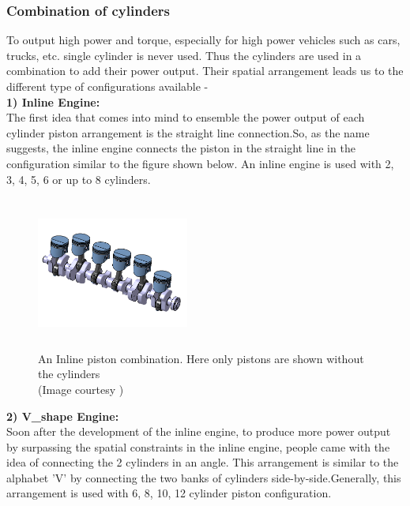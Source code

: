 \documentclass[11pt]{article}
\begin{document}
\begin{flushleft}
\subsubsection{Combination of cylinders}
To output high power and torque, especially for high power vehicles such as cars, trucks, etc. single cylinder is never used. Thus the cylinders are used in a combination to add their power output. Their spatial arrangement leads us to the different type of configurations available - \\
\textbf{1) Inline Engine:\\}
The first idea that comes into mind to ensemble the power output of each cylinder piston arrangement is the straight line connection.So, as the name suggests, the inline engine connects the piston in the straight line in the configuration similar to the figure shown below. An inline engine is used with 2, 3, 4, 5, 6 or up to 8 cylinders.\\
\end{flushleft}
\begin{center}
        \begin{figure}[!h]
        \centering
          \includegraphics[width=50mm, height=50mm]{Inline.jpg}
          \caption{An Inline piston combination. Here only pistons are shown without the cylinders\\ (Image courtesy \cite{ref11})
          }
          \label{fig:Piston}
        \end{figure}
\end{center}
\begin{flushleft}
\textbf{2) V\_shape Engine: \\}
Soon after the development of the inline engine, to produce more power output by surpassing the spatial constraints in the inline engine, people came with the idea of connecting the 2 cylinders in an angle. This arrangement is similar to the alphabet 'V' by connecting the two banks of cylinders side-by-side.Generally, this arrangement is used with 6, 8, 10, 12 cylinder piston configuration.
\end{flushleft}
\end{document}
